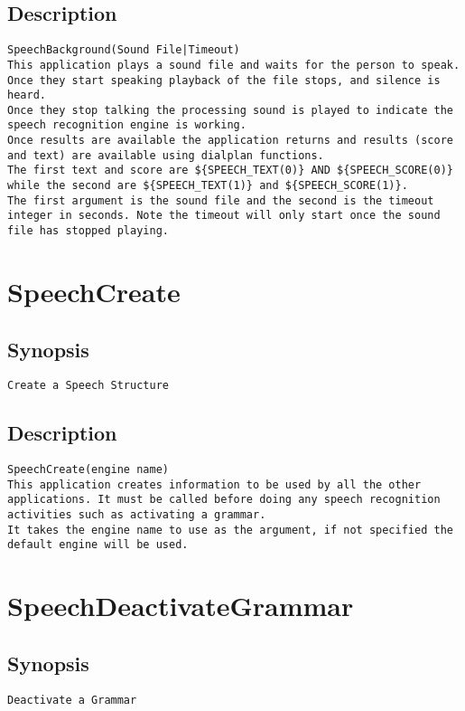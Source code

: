 \subsection{Description}
\begin{verbatim}
SpeechBackground(Sound File|Timeout)
This application plays a sound file and waits for the person to speak. Once they start speaking playback of the file stops, and silence is heard.
Once they stop talking the processing sound is played to indicate the speech recognition engine is working.
Once results are available the application returns and results (score and text) are available using dialplan functions.
The first text and score are ${SPEECH_TEXT(0)} AND ${SPEECH_SCORE(0)} while the second are ${SPEECH_TEXT(1)} and ${SPEECH_SCORE(1)}.
The first argument is the sound file and the second is the timeout integer in seconds. Note the timeout will only start once the sound file has stopped playing.

\end{verbatim}


\section{SpeechCreate}
\subsection{Synopsis}
\begin{verbatim}
Create a Speech Structure
\end{verbatim}
\subsection{Description}
\begin{verbatim}
SpeechCreate(engine name)
This application creates information to be used by all the other applications. It must be called before doing any speech recognition activities such as activating a grammar.
It takes the engine name to use as the argument, if not specified the default engine will be used.

\end{verbatim}


\section{SpeechDeactivateGrammar}
\subsection{Synopsis}
\begin{verbatim}
Deactivate a Grammar
\end{verbatim}
